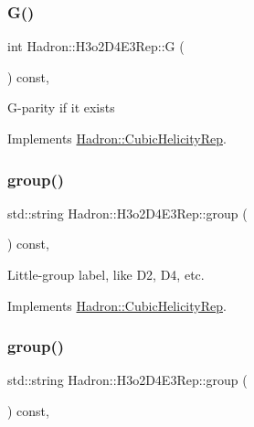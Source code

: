 \subsubsection{\texorpdfstring{G()}{G()}\hspace{0.1cm}{\footnotesize\ttfamily [3/3]}}
{\footnotesize\ttfamily int Hadron\+::\+H3o2\+D4\+E3\+Rep\+::G (\begin{DoxyParamCaption}{ }\end{DoxyParamCaption}) const\hspace{0.3cm}{\ttfamily [inline]}, {\ttfamily [virtual]}}

G-\/parity if it exists 

Implements \mbox{\hyperlink{structHadron_1_1CubicHelicityRep_a50689f42be1e6170aa8cf6ad0597018b}{Hadron\+::\+Cubic\+Helicity\+Rep}}.

\mbox{\label{structHadron_1_1H3o2D4E3Rep_acfb5a306823b56f4e03d1c7f818de23c}} 
\subsubsection{\texorpdfstring{group()}{group()}\hspace{0.1cm}{\footnotesize\ttfamily [1/5]}}
{\footnotesize\ttfamily std\+::string Hadron\+::\+H3o2\+D4\+E3\+Rep\+::group (\begin{DoxyParamCaption}{ }\end{DoxyParamCaption}) const\hspace{0.3cm}{\ttfamily [inline]}, {\ttfamily [virtual]}}

Little-\/group label, like D2, D4, etc. 

Implements \mbox{\hyperlink{structHadron_1_1CubicHelicityRep_a101a7d76cd8ccdad0f272db44b766113}{Hadron\+::\+Cubic\+Helicity\+Rep}}.

\mbox{\label{structHadron_1_1H3o2D4E3Rep_acfb5a306823b56f4e03d1c7f818de23c}} 
\subsubsection{\texorpdfstring{group()}{group()}\hspace{0.1cm}{\footnotesize\ttfamily [2/5]}}
{\footnotesize\ttfamily std\+::string Hadron\+::\+H3o2\+D4\+E3\+Rep\+::group (\begin{DoxyParamCaption}{ }\end{DoxyParamCaption}) const\hspace{0.3cm}{\ttfamily [inline]}, {\ttfamily [virtual]}}


